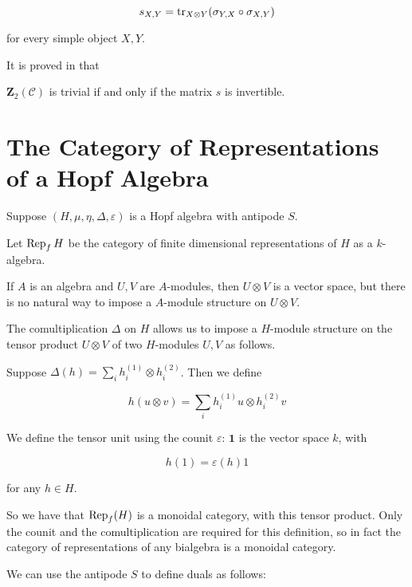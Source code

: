 \begin{equation}
    s_{X,Y} = \operatorname{tr}_{X \otimes Y}(\sigma_{Y,X} \circ \sigma_{X,Y})
\end{equation}

for every simple object $X,Y$.

It is proved in \cite{mueger2001} that
\begin{theorem}
    $\mathbf{Z}_2(\mathcal{C})$ is trivial if and only if the matrix $s$ is invertible. 
\end{theorem}


\section{The Category of Representations of a Hopf Algebra}
\label{section:RepHopfAlgebra}

Suppose $(H, \mu, \eta, \Delta, \varepsilon)$ is a Hopf algebra with antipode $S$. 

Let $\operatorname{Rep}_f H$ be the category of finite dimensional representations of $H$ as
a $k$-algebra.

If $A$ is an algebra and $U, V$ are $A$-modules, then $U \otimes V$ is a vector
space, but there is no natural way to impose a $A$-module structure on $U
\otimes V$. 

The comultiplication $\Delta$ on $H$ allows us to impose a $H$-module structure
on the tensor product $U \otimes V$ of two $H$-modules $U,V$ as follows.

Suppose $\Delta(h) = \sum _{i} h^{(1)}_i \otimes h^{(2)}_i$. Then we define

\begin{equation}
    h (u \otimes v) = \sum_{i} h^{(1)}_i u \otimes h^{(2)}_i v
\end{equation}

We define the tensor unit using the counit $\varepsilon$: $\mathbf{1}$ is the
vector space $k$, with 

\begin{equation}
    h(1) = \varepsilon(h) 1
\end{equation}

 for any $h\in H$.

So we have that $\operatorname{Rep}_f(H)$ is a monoidal category, with this tensor product.
Only the counit and the comultiplication are required for this definition, so
in fact the category of representations of any bialgebra is a monoidal
category.

We can use the antipode $S$ to define duals as follows:

